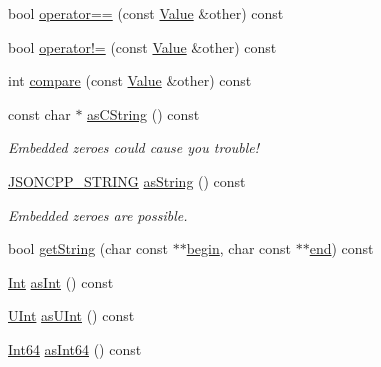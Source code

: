 \begin{DoxyCompactItemize}
\item 
bool \hyperlink{classJson_1_1Value_a16f9250e30d5c4505cd11137c564a764_a16f9250e30d5c4505cd11137c564a764}{operator==} (const \hyperlink{classJson_1_1Value}{Value} \&other) const
\item 
bool \hyperlink{classJson_1_1Value_a86e95be072e515c48abc61dec63a1689_a86e95be072e515c48abc61dec63a1689}{operator!=} (const \hyperlink{classJson_1_1Value}{Value} \&other) const
\item 
int \hyperlink{classJson_1_1Value_aefa4464ca1bb0bcc9a87b38ed62ca2e0_aefa4464ca1bb0bcc9a87b38ed62ca2e0}{compare} (const \hyperlink{classJson_1_1Value}{Value} \&other) const
\item 
const char $\ast$ \hyperlink{classJson_1_1Value_a16668c8db7ef0a5de040012f0dfd84b0_a16668c8db7ef0a5de040012f0dfd84b0}{as\+C\+String} () const
\begin{DoxyCompactList}\small\item\em Embedded zeroes could cause you trouble! \end{DoxyCompactList}\item 
\hyperlink{json_8h_a1e723f95759de062585bc4a8fd3fa4be_a1e723f95759de062585bc4a8fd3fa4be}{J\+S\+O\+N\+C\+P\+P\+\_\+\+S\+T\+R\+I\+NG} \hyperlink{classJson_1_1Value_ae3f9b0d38f820ccdd8888aa92ea6e792_ae3f9b0d38f820ccdd8888aa92ea6e792}{as\+String} () const
\begin{DoxyCompactList}\small\item\em Embedded zeroes are possible. \end{DoxyCompactList}\item 
bool \hyperlink{classJson_1_1Value_a2e1b7be6bde2fe23f15290d9ddbbdf8a_a2e1b7be6bde2fe23f15290d9ddbbdf8a}{get\+String} (char const $\ast$$\ast$\hyperlink{classJson_1_1Value_a015459a3950c198d63a2d3be8f5ae296_a015459a3950c198d63a2d3be8f5ae296}{begin}, char const $\ast$$\ast$\hyperlink{classJson_1_1Value_a3e443cd0ef24f7e028b175e47ee045e0_a3e443cd0ef24f7e028b175e47ee045e0}{end}) const
\item 
\hyperlink{classJson_1_1Value_abdf7a7ff73eb130ffcab28504ffdb405_abdf7a7ff73eb130ffcab28504ffdb405}{Int} \hyperlink{classJson_1_1Value_a614d635bc248a592593feb322cd15ab8_a614d635bc248a592593feb322cd15ab8}{as\+Int} () const
\item 
\hyperlink{classJson_1_1Value_a0933d59b45793ae4aade1757c322a98d_a0933d59b45793ae4aade1757c322a98d}{U\+Int} \hyperlink{classJson_1_1Value_a74b305583ec3aacf4f9dd06e799dc265_a74b305583ec3aacf4f9dd06e799dc265}{as\+U\+Int} () const
\item 
\hyperlink{classJson_1_1Value_a1b86af9f85f0f1baa972c3319fa22695_a1b86af9f85f0f1baa972c3319fa22695}{Int64} \hyperlink{classJson_1_1Value_aa647ac4fe51a2e325c063ebe32262b44_aa647ac4fe51a2e325c063ebe32262b44}{as\+Int64} () const

\end{DoxyCompactItemize}
